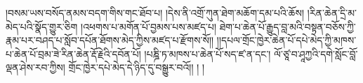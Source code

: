 །བསམ་ཡས་བསོད་ནམས་བདག་གིས་གང་ཐོབ་པ། །དེས་ནི་འགྲོ་ཀུན་ཐེག་མཆོག་དམ་པའི་ཆོས། །རིན་ཆེན་དྲི་མ་མེད་པའི་སྣོད་གྱུར་ཅིག །འཕགས་པ་མགོན་པོ་བྱམས་པས་མཛད་པ། ཐེག་པ་ཆེན་པོ་རྒྱུད་བླ་མའི་བསྟན་བཅོས་ཀྱི་རྣམ་པར་བཤད་པ་སློབ་དཔོན་ཐོགས་མེད་ཀྱིས་མཛད་པ་རྫོགས་སོ།། །།དཔལ་གྲོང་ཁྱེར་ཆེན་པོ་དཔེ་མེད་ཀྱི་མཁས་པ་ཆེན་པོ་བྲམ་ཟེ་རིན་ཆེན་རྡོ་རྗེའི་དབོན་པོ། །པཎྜི་ཏ་མཁས་པ་ཆེན་པོ་སད་ཛ་ན་དང་། ལོ་ཙཱ་བ་ཤཱཀྱའི་དགེ་སློང་བློ་ལྡན་ཤེས་རབ་ཀྱིས། གྲོང་ཁྱེར་དཔེ་མེད་དེ་ཉིད་དུ་བསྒྱུར་བའོ།། །
།